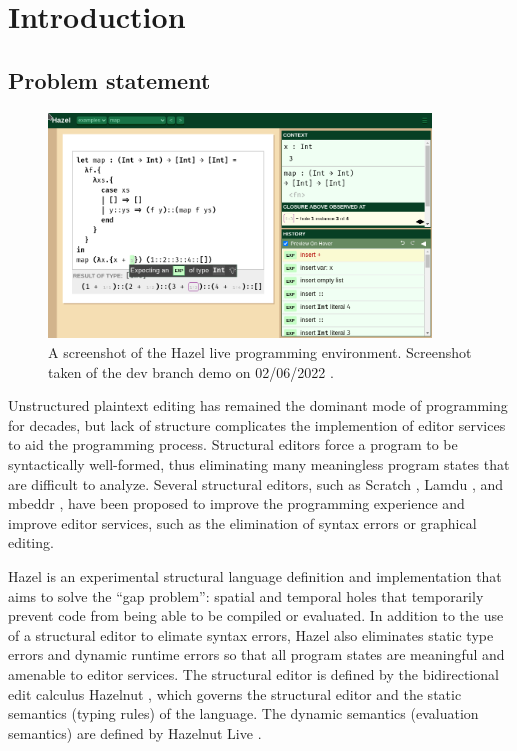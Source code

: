 \chapter{Introduction}
\label{sec:introduction}

\section{Problem statement}
\label{sec:prob_stmt}

\begin{figure}
  \centering
  \includegraphics[width=4in]{img/hazel_ui.png}
  \caption[Screenshot of the Hazel live programming environment.]{A screenshot of the Hazel live programming environment. Screenshot taken of the dev branch demo on 02/06/2022 \cite{HazelDemo2022}.}
  \label{fig:screenshot-hazel-ui}
\end{figure}

Unstructured plaintext editing has remained the dominant mode of programming for decades, but lack of structure complicates the implemention of editor services to aid the programming process. Structural editors force a program to be syntactically well-formed, thus eliminating many meaningless program states that are difficult to analyze. Several structural editors, such as Scratch \cite{maloney2010scratch}, Lamdu \cite{lotem_chuchem}, and mbeddr \cite{voelter2012mbeddr}, have been proposed to improve the programming experience and improve editor services, such as the elimination of syntax errors or graphical editing.

Hazel \cite{hazel_git} is an experimental structural language definition and implementation that aims to solve the ``gap problem'': spatial and temporal holes that temporarily prevent code from being able to be compiled or evaluated. In addition to the use of a structural editor to elimate syntax errors, Hazel also eliminates static type errors and dynamic runtime errors so that all program states are meaningful and amenable to editor services. The structural editor is defined by the bidirectional edit calculus Hazelnut \cite{conf/popl/Hazelnut17}, which governs the structural editor and the static semantics (typing rules) of the language. The dynamic semantics (evaluation semantics) are defined by Hazelnut Live \cite{conf/popl/HazelnutLive19}.

